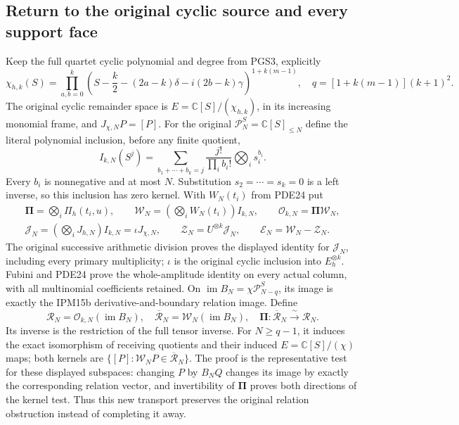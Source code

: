\subsection{Return to the original cyclic source and every support face}

Keep the full quartet cyclic polynomial and degree from PGS3, explicitly
\[
 \chi_{h,k}(S)=\prod_{a,b=0}^k
 \left(S-\frac k2-(2a-k)\delta-i(2b-k)\gamma\right)^{1+k(m-1)},
 \quad q=[1+k(m-1)](k+1)^2.
 \tag{PDE33a}
\]
The original cyclic remainder space is $E=\mathbb{C}[S]/(\chi_{h,k})$,
in its increasing monomial frame, and $J_{\chi,N}P=[P]$.
For the original
$\mathcal P_N^S=\mathbb{C}[S]_{\leq N}$ define the literal polynomial
inclusion, before any finite quotient,
\[
 I_{k,N}(S^j)=\sum_{b_1+\cdots+b_k=j}
                       \frac{j!}{\prod_i b_i!}\bigotimes_i s_i^{b_i}.
 \tag{PDE33}
\]
Every $b_i$ is nonnegative and at most $N$. Substitution
$s_2=\cdots=s_k=0$ is a left inverse, so this inclusion has zero
kernel. With $W_N(t_i)$ from PDE24 put
\[
 \begin{gathered}
 \boldsymbol\Pi=\bigotimes_i\Pi_h(t_i,u),\qquad
 \mathcal W_N=\left(\bigotimes_i W_N(t_i)\right)I_{k,N},\qquad
 \mathcal O_{k,N}=\boldsymbol\Pi\mathcal W_N,\\
 \mathcal J_N=\left(\bigotimes_iJ_{h,N}\right)I_{k,N}
                  =\iota J_{\chi,N},\qquad
 \mathcal Z_N=U^{\otimes k}\mathcal J_N,\qquad
 \mathcal E_N=\mathcal W_N-\mathcal Z_N.
 \end{gathered}
 \tag{PDE34}
\]
The original successive arithmetic division proves the displayed
identity for $\mathcal J_N$, including every primary multiplicity;
$\iota$ is the original cyclic inclusion into $E_h^{\otimes k}$.
Fubini and PDE24 prove the whole-amplitude identity on every actual
column, with all multinomial coefficients retained. On
$\operatorname{im}B_N=\chi\mathcal P_{N-q}^S$, its image is exactly
the IPM15b derivative-and-boundary relation image. Define
\[
 \mathcal R_N=\mathcal O_{k,N}(\operatorname{im}B_N),\quad
 \overline{\mathcal R}_N
    =\mathcal W_N(\operatorname{im}B_N),\quad
 \boldsymbol\Pi:\overline{\mathcal R}_N\xrightarrow{\ \sim\ }
                                                   \mathcal R_N.
 \tag{PDE35}
\]
Its inverse is the restriction of the full tensor inverse. For
$N\geq q-1$, it induces the exact isomorphism of receiving quotients and their induced
$E=\mathbb{C}[S]/(\chi)$ maps; both kernels are
$\{[P]:\mathcal W_NP\in\overline{\mathcal R}_N\}$.
The proof is the representative test for these displayed subspaces:
changing $P$ by $B_NQ$ changes its image by exactly the corresponding
relation vector, and invertibility of $\boldsymbol\Pi$ proves both
directions of the kernel test. Thus this new transport preserves the
original relation obstruction instead of completing it away.

